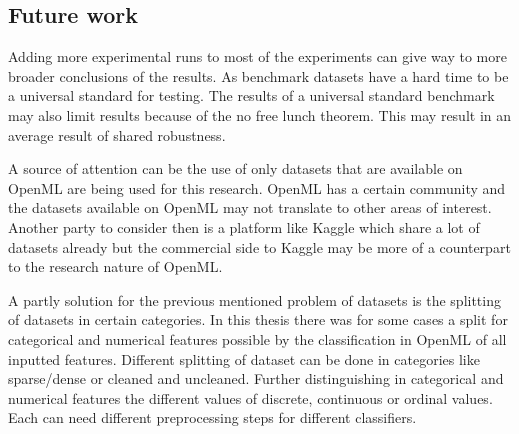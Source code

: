 \documentclass[a4paper,10pt]{article}
\begin{document}




\subsection{Future work}
Adding more experimental runs to most of the experiments can give way to more broader conclusions of the results. As benchmark datasets have a hard time to be a universal standard for testing. The results of a universal standard benchmark may also limit results because of the no free lunch theorem. This may result in an average result of shared robustness.

A source of attention can be the use of only datasets that are available on OpenML are being used for this research. OpenML has a certain community and the datasets available on OpenML may not translate to other areas of interest. Another party to consider then is a platform like Kaggle which share a lot of datasets already but the commercial side to Kaggle may be more of a counterpart to the research nature of OpenML. 

A partly solution for the previous mentioned problem of datasets is the splitting of datasets in certain categories. In this thesis there was for some cases a split for categorical and numerical features possible by the classification in OpenML of all inputted features. Different splitting of dataset can be done in categories like sparse/dense or cleaned and uncleaned. Further distinguishing in categorical and numerical features the different values of discrete, continuous or ordinal values. Each can need different preprocessing steps for different classifiers. 





\newpage
\end{document}
